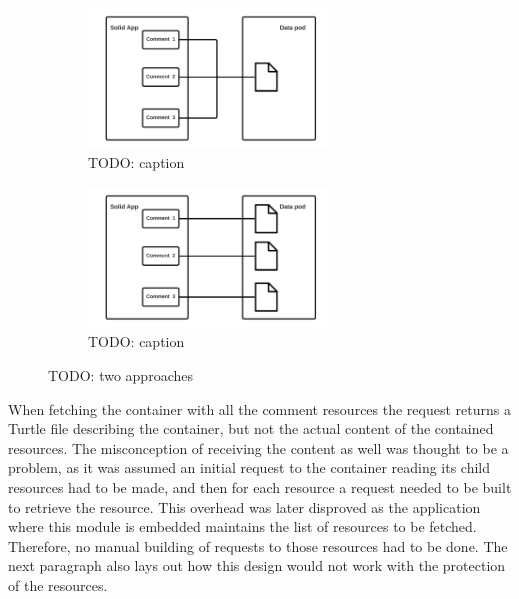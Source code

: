 \begin{figure}
    \centering
    \begin{subfigure}{.5\textwidth}
      \centering
      \includegraphics[width=0.7\textwidth]{prototype/graphs/poc-comment-single-resource-comments.png}
      \caption{TODO: caption}
      \label{fig:ppc-comment-single-resource-comments}
    \end{subfigure}%
    \begin{subfigure}{.5\textwidth}
      \centering
      \includegraphics[width=0.7\textwidth]{prototype/graphs/poc-comment-multiple-resources-comments.png}
      \caption{TODO: caption}
      \label{fig:poc-comment-multiple-resources-comments}
    \end{subfigure}
    \caption{TODO: two approaches}
    \label{fig:TODO}
\end{figure}

When fetching the container with all the comment resources the request returns a Turtle file describing the container, but not the actual content of the contained resources. The misconception of receiving the content as well was thought to be a problem, as it was assumed an initial request to the container reading its child resources had to be made, and then for each resource a request needed to be built to retrieve the resource. This overhead was later disproved as the application where this module is embedded maintains the list of resources to be fetched. Therefore, no manual building of requests to those resources had to be done. The next paragraph also lays out how this design would not work with the protection of the resources.

